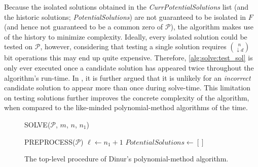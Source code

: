 Because the isolated solutions obtained in the \textit{CurrPotentialSolutions} list (and the historic solutions; \textit{PotentialSolutions}) are not guaranteed to be isolated in $F$ (and hence not guaranteed to be a common zero of $\mathcal{P}$), the algorithm makes use of the history to minimize complexity. Ideally, every isolated solution could be tested on $\mathcal{P}$, however, considering that testing a single solution requires $\binom{n}{\downarrow d}$ bit operations this may end up quite expensive. Therefore, \cref{alg:solve:test_sol} is only ever executed once a candidate solution has appeared twice throughout the algorithm's run-time. In \cite{cryptoeprint:2021/578}, it is further argued that it is unlikely for an \textit{incorrect} candidate solution to appear more than once during solve-time. This limitation on testing solutions further improves the concrete complexity of the algorithm, when compared to the like-minded polynomial-method algorithms of the time.
\begin{figure}[ht]
    \centering
    \begin{alg}
        \caption{SOLVE($\mathcal{P}$, $m$, $n$, $n_1$)}
        \label{alg:solve}
         \label{alg:solve:matrix}
        PREPROCESS($\mathcal{P}$)\; \label{alg:solve:preprocess}
        $\ell \gets n_1 + 1$\;
        $PotentialSolutions \gets []$\;
    \end{alg}
    \caption{The top-level procedure of Dinur's polynomial-method algorithm.}
\end{figure}


